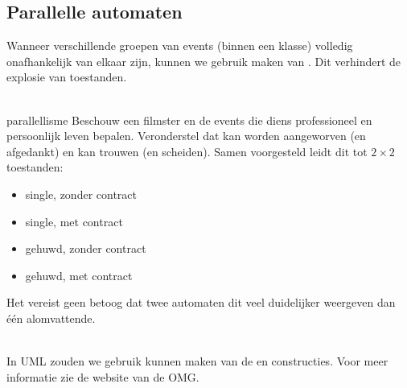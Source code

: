 \documentclass[../../main.tex]{subfiles}
\begin{document}
\subsection{Parallelle automaten}
Wanneer verschillende groepen van events (binnen een klasse) volledig onafhankelijk van elkaar zijn, kunnen we gebruik maken van . Dit verhindert de explosie van toestanden. \\
\\
\begin{ex}{parallellisme}
Beschouw een filmster en de events die diens professioneel en persoonlijk leven bepalen. Veronderstel dat kan worden aangeworven (en afgedankt) en kan trouwen (en scheiden). Samen voorgesteld leidt dit tot $2 \times 2$ toestanden:
\begin{itemize}
	\item single, zonder contract
	\item single, met contract
	\item gehuwd, zonder contract
	\item gehuwd, met contract
\end{itemize}
Het vereist geen betoog dat twee automaten dit veel duidelijker weergeven dan \'e\'en alomvattende.
\end{ex}
\\
In UML zouden we gebruik kunnen maken van de  en  constructies. Voor meer informatie zie de website van de OMG.
\end{document}
